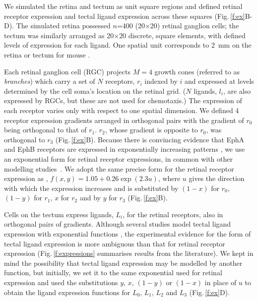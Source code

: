 \documentclass[11pt, a4paper]{article}
\begin{document}
We simulated the retina and tectum as unit square regions and defined retinal receptor expression and tectal ligand expression across these squares (Fig.\,\ref{f:ex}B-D).
The simulated retina possessed $n$=400 (20$\times$20) retinal ganglion cells; the tectum was similarly arranged as 20$\times$20 discrete, square elements, with defined levels of expression for each ligand.
One spatial unit corresponds to 2~mm on the retina or tectum for mouse \citep{reber_relative_2004}.

Each retinal ganglion cell (RGC) projects $M=4$ growth cones (referred to as \emph{branches}) which carry a set of $N$ receptors, $r_i$ indexed by $i$ and expressed at levels determined by the cell soma's location on the retinal grid.
($N$ ligands, $l_i$, are also expressed by RGCs, but these are not used for chemotaxis.)
The expression of each receptor varies only with respect to one spatial dimension.
%
We defined 4 receptor expression gradients arranged in orthogonal pairs with the gradient of $r_0$ being orthogonal to that of $r_1$. $r_2$, whose gradient is opposite to $r_0$, was orthogonal to $r_3$ (Fig.\,\ref{f:ex}B).
%
Because there is convincing evidence that EphA and EphB receptors are expressed in exponentially increasing patterns \citep{reber_relative_2004,feldheim_genetic_2000,brown_topographic_2000,koulakov_stochastic_2004}, we use an exponential form for retinal receptor expressions, in common with other modelling studies~\citep{reber_relative_2004,koulakov_stochastic_2004,simpson_simple_2011}.
We adopt the same precise form for the retinal receptor expression as \citet{simpson_simple_2011}, $f(x,y) = 1.05 + 0.26 \exp(2.3 u)$, where $u$ gives the direction with which the expression increases and is substituted by $(1-x)$ for $r_0$, $(1-y)$ for $r_1$, $x$ for $r_2$ and by $y$ for $r_3$ (Fig.\,\ref{f:ex}B).

Cells on the tectum express ligands, $L_i$, for the retinal receptors, also in orthogonal pairs of gradients.
Although several studies model tectal ligand expression with exponential functions \citep{koulakov_stochastic_2004}, the experimental evidence for the form of tectal ligand expression is more ambiguous than that for retinal receptor expression (Fig.\,\ref{f:expressions} summarises results from the literature).
We kept in mind the possibility that tectal ligand expression may be modelled by another function, but initially, we set it to the same exponential used for retinal expression and used the substitutions $y$, $x$, $(1-y)$ or $(1-x)$ in place of $u$ to obtain the ligand expression functions for $L_0$, $L_1$, $L_2$ and $L_3$ (Fig.\,\ref{f:ex}D).
\end{document}
